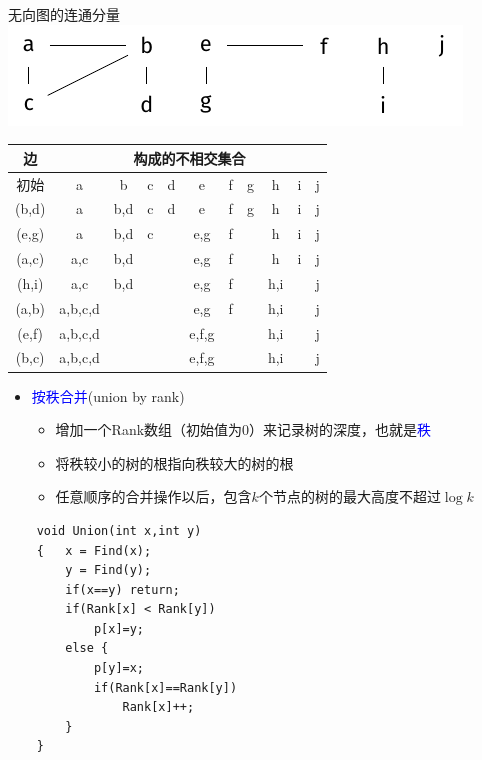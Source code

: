 \begin{frame}{无向图的连通分量}
    \includegraphics[center]{fig/6-1.pdf}
    \begin{table}
        \begin{tabular}{c|c|c|c|c|c|c|c|c|c|c}
            边   & \multicolumn{10}{c}{构成的不相交集合} \\\hline
            初始     &  a          &  b    &  c   &  d   &  e      &  f   &  g   &  h    &  i   &  j   \\\hline
            (b,d)   &  a          &  b,d  &  c   &  d   &  e      &  f   &  g   &  h    &  i   &  j    \\\hline
            (e,g)   &  a          &  b,d  &  c   &      &  e,g    &  f   &      &  h    &  i   &  j    \\\hline
            (a,c)   &  a,c         &  b,d  &      &      &  e,g    &  f   &      &  h    &  i   &  j    \\\hline
            (h,i)   &  a,c         &  b,d  &      &      &  e,g    &  f   &      &  h,i  &      &  j    \\\hline
            (a,b)   &  a,b,c,d     &       &      &      &  e,g    &  f   &      &  h,i  &      &  j    \\\hline
            (e,f)   &  a,b,c,d     &       &      &      &  e,f,g  &      &      &  h,i  &      &  j    \\\hline
            (b,c)   &  a,b,c,d     &       &      &      &  e,f,g  &      &      &  h,i  &      &  j    \\\hline
        \end{tabular}
    \end{table}
\end{frame}
\begin{itemize}
    \item \textcolor{blue}{按秩合并}(union by rank)
    \begin{itemize}
        \item 增加一个Rank数组（初始值为0）来记录树的深度，也就是\textcolor{blue}{秩}
        \item 将秩较小的树的根指向秩较大的树的根
        \item 任意顺序的合并操作以后，包含$k$个节点的树的最大高度不超过$\log k$
    \end{itemize} 
\end{itemize}
\begin{lstlisting}
    void Union(int x,int y)  
    {   x = Find(x);
        y = Find(y);
        if(x==y) return;
        if(Rank[x] < Rank[y])
            p[x]=y;
        else {
            p[y]=x;
            if(Rank[x]==Rank[y])
                Rank[x]++;
        }
    }
\end{lstlisting}

